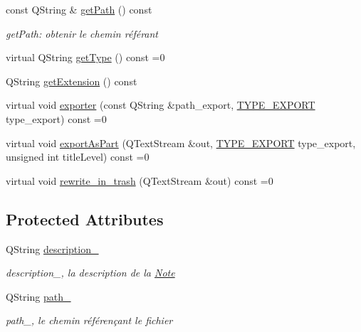 \begin{DoxyCompactItemize}
const Q\-String \& \hyperlink{class_notes_module_1_1_multimedia_af184859fb26e134660a555d5a502b6b0}{get\-Path} () const 
\begin{DoxyCompactList}\small\item\em get\-Path\-: obtenir le chemin référant \end{DoxyCompactList}\item 
virtual Q\-String \hyperlink{class_notes_module_1_1_multimedia_a3380989b66a74159e22046490fce1cb7}{get\-Type} () const =0
\item 
Q\-String \hyperlink{class_notes_module_1_1_multimedia_a01591bd65388c073a945c294eec2bb83}{get\-Extension} () const 
\item 
virtual void \hyperlink{class_notes_module_1_1_multimedia_a14d7e27fe91172717ed41e572666c4fa}{exporter} (const Q\-String \&path\-\_\-export, \hyperlink{_t_y_p_e_s___e_x_p_o_r_t_8h_a25a17d8584d83ab977791df2476e006c}{T\-Y\-P\-E\-\_\-\-E\-X\-P\-O\-R\-T} type\-\_\-export) const =0
\item 
virtual void \hyperlink{class_notes_module_1_1_multimedia_afd58f93d779e3c47226344edbca4b935}{export\-As\-Part} (Q\-Text\-Stream \&out, \hyperlink{_t_y_p_e_s___e_x_p_o_r_t_8h_a25a17d8584d83ab977791df2476e006c}{T\-Y\-P\-E\-\_\-\-E\-X\-P\-O\-R\-T} type\-\_\-export, unsigned int title\-Level) const =0
\item 
virtual void \hyperlink{class_notes_module_1_1_multimedia_a43df5a7e5a7c8dbc6fd7ca9c39bb6623}{rewrite\-\_\-in\-\_\-trash} (Q\-Text\-Stream \&out) const =0
\end{DoxyCompactItemize}
\subsection*{Protected Attributes}
\begin{DoxyCompactItemize}
\item 
Q\-String \hyperlink{class_notes_module_1_1_multimedia_a37df67b92a13a673b96adfde9c4eb865}{description\-\_\-}
\begin{DoxyCompactList}\small\item\em description\-\_\-, la description de la \hyperlink{class_notes_module_1_1_note}{Note} \end{DoxyCompactList}\item 
Q\-String \hyperlink{class_notes_module_1_1_multimedia_af00afad489194bafcbf6c726cce7d496}{path\-\_\-}
\begin{DoxyCompactList}\small\item\em path\-\_\-, le chemin référençant le fichier \end{DoxyCompactList}\end{DoxyCompactItemize}
